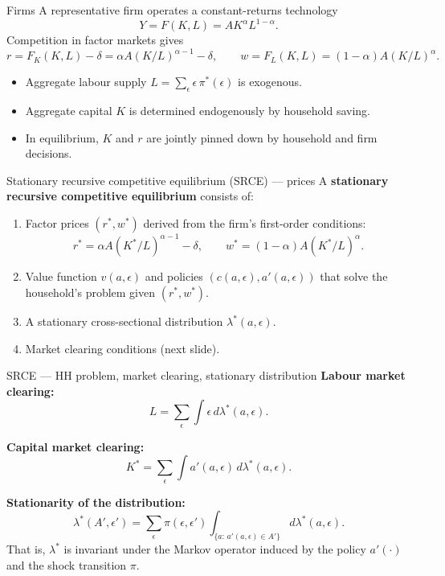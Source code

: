 \begin{frame}{Firms}
A representative firm operates a constant-returns technology
\[
Y = F(K,L) = A K^{\alpha} L^{1-\alpha}.
\]
Competition in factor markets gives
\[
r = F_K(K,L) - \delta = \alpha A (K/L)^{\alpha-1} - \delta, \qquad
w = F_L(K,L) = (1-\alpha) A (K/L)^{\alpha}.
\]
\medskip
\begin{itemize}
\item Aggregate labour supply $L = \sum_\epsilon \epsilon\,\pi^*(\epsilon)$ is exogenous.
\item Aggregate capital $K$ is determined endogenously by household saving.
\item In equilibrium, $K$ and $r$ are jointly pinned down by household and firm decisions.
\end{itemize}
\end{frame}

\begin{frame}{Stationary recursive competitive equilibrium (SRCE) --- prices}
A \textbf{stationary recursive competitive equilibrium} consists of:
\begin{enumerate}
\item Factor prices $(r^*, w^*)$ derived from the firm's first-order conditions:
\[
r^* = \alpha A (K^*/L)^{\alpha-1} - \delta, \qquad w^* = (1-\alpha) A (K^*/L)^{\alpha}.
\]
\medskip
\item Value function $v(a,\epsilon)$ and policies $(c(a,\epsilon), a'(a,\epsilon))$ that solve the household's problem given $(r^*,w^*)$.
\medskip
\item A stationary cross-sectional distribution $\lambda^*(a,\epsilon)$.
\medskip
\item Market clearing conditions (next slide).
\end{enumerate}
\end{frame}

\begin{frame}{SRCE --- HH problem, market clearing, stationary distribution}
\textbf{Labour market clearing:}
\[
L = \sum_{\epsilon} \int \epsilon \, d\lambda^*(a,\epsilon).
\]

\textbf{Capital market clearing:}
\[
K^* = \sum_{\epsilon} \int a'(a,\epsilon) \, d\lambda^*(a,\epsilon).
\]

\textbf{Stationarity of the distribution:}
\[
\lambda^*(A',\epsilon') = \sum_{\epsilon} \pi(\epsilon,\epsilon') \int_{\{a:\,a'(a,\epsilon)\in A'\}} d\lambda^*(a,\epsilon).
\]
\medskip
That is, $\lambda^*$ is invariant under the Markov operator induced by the policy $a'(\cdot)$ and the shock transition $\pi$.
\end{frame}

